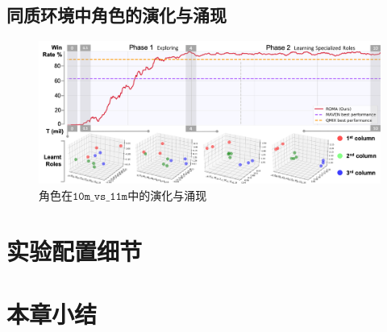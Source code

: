 \subsection{同质环境中角色的演化与涌现}
\begin{figure}
  \includegraphics[width=\linewidth]{figures/evolution/evolution_10m_vs_11m.png}
  \caption{角色在$\mathtt{10m\_vs\_11m}$中的演化与涌现}\label{fig:role_evolution-homo}
\end{figure}


\section{实验配置细节}\label{sec:exp-detail}

\section{本章小结}


